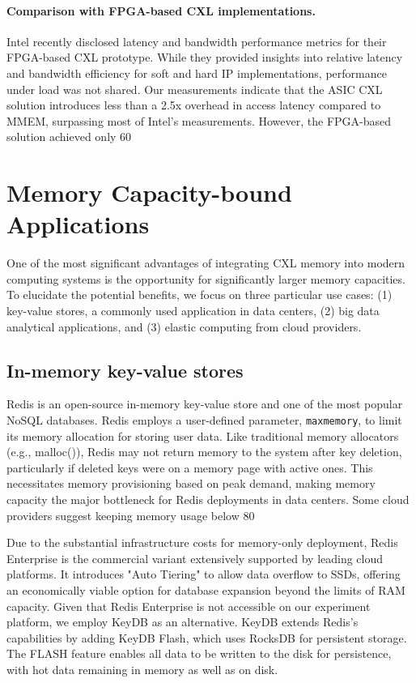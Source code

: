 \paragraph{Comparison with FPGA-based CXL implementations.} Intel recently disclosed latency and bandwidth performance metrics for their FPGA-based CXL prototype. While they provided insights into relative latency and bandwidth efficiency for soft and hard IP implementations, performance under load was not shared. Our measurements indicate that the ASIC CXL solution introduces less than a 2.5x overhead in access latency compared to MMEM, surpassing most of Intel's measurements. However, the FPGA-based solution achieved only 60%


\section{Memory Capacity-bound Applications} \label{sec
}

One of the most significant advantages of integrating CXL memory into modern computing systems is the opportunity for significantly larger memory capacities. To elucidate the potential benefits, we focus on three particular use cases: (1) key-value stores, a commonly used application in data centers, (2) big data analytical applications, and (3) elastic computing from cloud providers.

\subsection{In-memory key-value stores} \label{ssec
} Redis is an open-source in-memory key-value store and one of the most popular NoSQL databases. Redis employs a user-defined parameter, \texttt{maxmemory}, to limit its memory allocation for storing user data. Like traditional memory allocators (e.g., malloc()), Redis may not return memory to the system after key deletion, particularly if deleted keys were on a memory page with active ones. This necessitates memory provisioning based on peak demand, making memory capacity the major bottleneck for Redis deployments in data centers. Some cloud providers suggest keeping memory usage below 80%

Due to the substantial infrastructure costs for memory-only deployment, Redis Enterprise is the commercial variant extensively supported by leading cloud platforms. It introduces "Auto Tiering" to allow data overflow to SSDs, offering an economically viable option for database expansion beyond the limits of RAM capacity. Given that Redis Enterprise is not accessible on our experiment platform, we employ KeyDB as an alternative. KeyDB extends Redis's capabilities by adding KeyDB Flash, which uses RocksDB for persistent storage. The FLASH feature enables all data to be written to the disk for persistence, with hot data remaining in memory as well as on disk.


